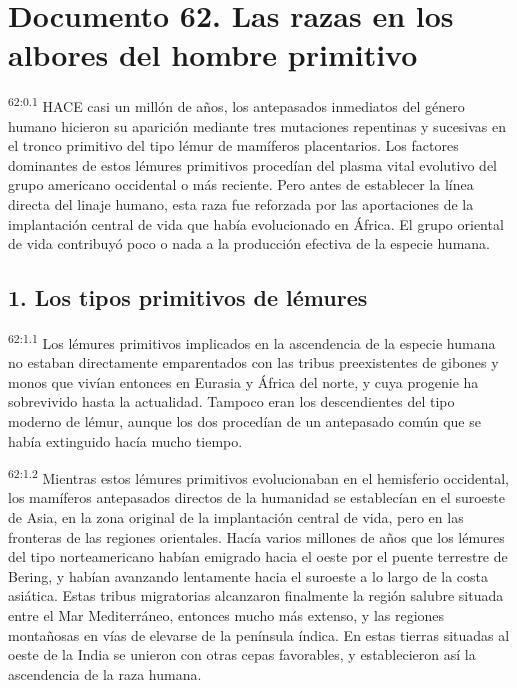 \chapter{Documento 62. Las razas en los albores del hombre primitivo}
\par
\textsuperscript{62:0.1} HACE casi un millón de años, los antepasados inmediatos del género humano hicieron su aparición mediante tres mutaciones repentinas y sucesivas en el tronco primitivo del tipo lémur de mamíferos placentarios. Los factores dominantes de estos lémures primitivos procedían del plasma vital evolutivo del grupo americano occidental o más reciente. Pero antes de establecer la línea directa del linaje humano, esta raza fue reforzada por las aportaciones de la implantación central de vida que había evolucionado en
África. El grupo oriental de vida contribuyó poco o nada a la producción efectiva de la especie humana.

\section*{1. Los tipos primitivos de lémures}
\par
\textsuperscript{62:1.1} Los lémures primitivos implicados en la ascendencia de la especie humana no estaban directamente emparentados con las tribus preexistentes de gibones y monos que vivían entonces en Eurasia y África del norte, y cuya progenie ha sobrevivido hasta la actualidad. Tampoco eran los descendientes del tipo moderno de lémur, aunque los dos procedían de un antepasado común que se había extinguido hacía mucho tiempo.

\par
\textsuperscript{62:1.2} Mientras estos lémures primitivos evolucionaban en el hemisferio occidental, los mamíferos antepasados directos de la humanidad se establecían en el suroeste de Asia, en la zona original de la implantación central de vida, pero en las fronteras de las regiones orientales. Hacía varios millones de años que los lémures del tipo norteamericano habían emigrado hacia el oeste por el puente terrestre de Bering, y habían avanzando lentamente hacia el suroeste a lo largo de la costa asiática. Estas tribus migratorias alcanzaron finalmente la región salubre situada entre el Mar Mediterráneo, entonces mucho más extenso, y las regiones montañosas en vías de elevarse de la península índica. En estas tierras situadas al oeste de la India se unieron con otras cepas favorables, y establecieron así la ascendencia de la raza humana.

